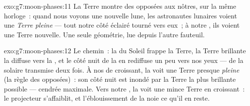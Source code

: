 \begin{solution}{exo:g7:moon-phases:11}
La Terre montre des  opposées aux nôtres, sur la même horloge~:
quand nous voyons une nouvelle lune, les astronautes lunaires voient
une \emph{Terre pleine} --- tout notre côté éclairé tourné vers
eux~; à notre , ils voient une Terre nouvelle. Une seule
géométrie, lue depuis l'autre fauteuil.
\end{solution}

\begin{solution}{exo:g7:moon-phases:12}
Le chemin~: la  du Soleil frappe la Terre, la Terre brillante
la diffuse vers la , et le côté nuit de la  en rediffuse un
peu vers nos yeux --- de la  solaire transmise deux fois. À
nos  de croissant, la  voit une Terre presque
\emph{pleine} (la règle des  opposées)~: son côté nuit est
inondé par la Terre la plus brillante possible ---  cendrée
maximale. Vers notre , la  voit une mince Terre en
croissant~: le projecteur s'affaiblit, et l'éblouissement de la
 noie ce qu'il en reste.
\end{solution}

